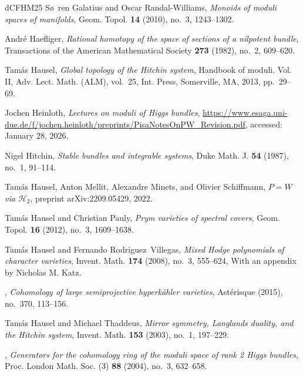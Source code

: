 \documentclass[11pt,reqno]{amsart}
\theoremstyle{plain} %
\theoremstyle{definition}
\begin{document}
\begin{thebibliography}{dCFHM25}
S\o~ren Galatius and Oscar Randal-Williams, \emph{Monoids of moduli spaces of
  manifolds}, Geom. Topol. \textbf{14} (2010), no.~3, 1243--1302. 

André Haefliger, \emph{Rational homotopy of the space of sections of a
  nilpotent bundle}, Transactions of the American Mathematical Society
  \textbf{273} (1982), no.~2, 609--620. 

Tam\'as Hausel, \emph{Global topology of the {H}itchin system}, Handbook of
  moduli. {V}ol. {II}, Adv. Lect. Math. (ALM), vol.~25, Int. Press, Somerville,
  MA, 2013, pp.~29--69. 

Jochen Heinloth, \emph{Lectures on moduli of {H}iggs bundles},
  \url{https://www.esaga.uni-due.de/f/jochen.heinloth/preprints/PisaNotesOnPW_Revision.pdf},
  accessed: January 28, 2026.

Nigel Hitchin, \emph{Stable bundles and integrable systems}, Duke Math. J.
  \textbf{54} (1987), no.~1, 91--114. 

Tam\'as Hausel, Anton Mellit, Alexandre Minets, and Olivier Schiffmann,
  \emph{{$P=W$} via $\mathcal{H}_2$}, preprint arXiv:2209.05429, 2022.

Tam\'as Hausel and Christian Pauly, \emph{Prym varieties of spectral covers},
  Geom. Topol. \textbf{16} (2012), no.~3, 1609--1638. 

Tam\'as Hausel and Fernando Rodriguez~Villegas, \emph{Mixed {H}odge polynomials
  of character varieties}, Invent. Math. \textbf{174} (2008), no.~3, 555--624,
  With an appendix by Nicholas M. Katz. 

\bysame, \emph{Cohomology of large semiprojective hyperk\"ahler varieties},
  Ast\'erisque (2015), no.~370, 113--156. 

Tam\'as Hausel and Michael Thaddeus, \emph{Mirror symmetry, {L}anglands
  duality, and the {H}itchin system}, Invent. Math. \textbf{153} (2003), no.~1,
  197--229. 

\bysame, \emph{Generators for the cohomology ring of the moduli space of rank 2
  {H}iggs bundles}, Proc. London Math. Soc. (3) \textbf{88} (2004), no.~3,
  632--658. 


\end{thebibliography}
\end{document}
